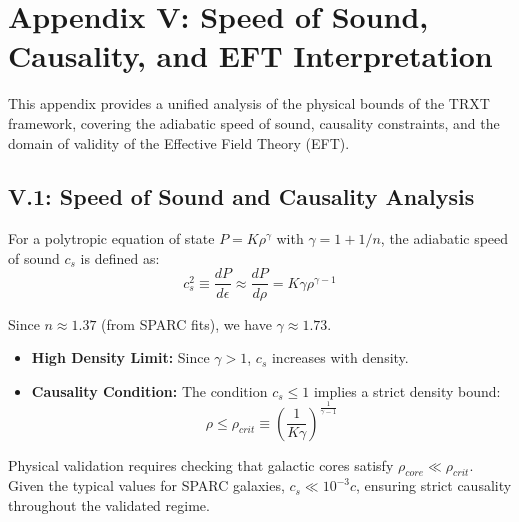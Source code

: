\section{Appendix V: Speed of Sound, Causality, and EFT Interpretation}
\label{app:eft_causality}

This appendix provides a unified analysis of the physical bounds of the TRXT framework, covering the adiabatic speed of sound, causality constraints, and the domain of validity of the Effective Field Theory (EFT).

\subsection{V.1: Speed of Sound and Causality Analysis}

For a polytropic equation of state $P = K \rho^\gamma$ with $\gamma = 1 + 1/n$, the adiabatic speed of sound $c_s$ is defined as:
\begin{equation}
    c_s^2 \equiv \frac{dP}{d\epsilon} \approx \frac{dP}{d\rho} = K \gamma \rho^{\gamma-1}
\end{equation}

Since $n \approx 1.37$ (from SPARC fits), we have $\gamma \approx 1.73$.
\begin{itemize}
    \item \textbf{High Density Limit:} Since $\gamma > 1$, $c_s$ increases with density.
    \item \textbf{Causality Condition:} The condition $c_s \le 1$ implies a strict density bound:
    \begin{equation}
        \rho \le \rho_{crit} \equiv \left( \frac{1}{K \gamma} \right)^{\frac{1}{\gamma-1}}
    \end{equation}
\end{itemize}
Physical validation requires checking that galactic cores satisfy $\rho_{core} \ll \rho_{crit}$. Given the typical values for SPARC galaxies, $c_s \ll 10^{-3} c$, ensuring strict causality throughout the validated regime.

